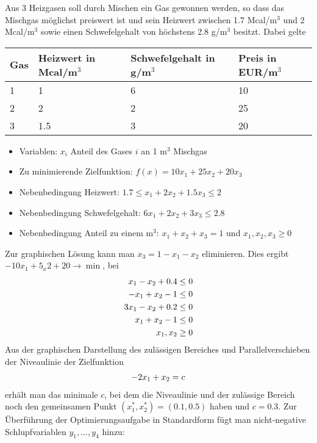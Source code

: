 \setcounter{theorem}{0}
\begin{example}
	Aus 3 Heizgasen soll durch Mischen ein Gas gewonnen werden, so dass das Mischgas möglichst preiswert ist und sein Heizwert zwischen 1.7 Mcal/m$^3$ und 2 Mcal/m$^3$ sowie einen Schwefelgehalt von höchstens 2.8 g/m$^3$ besitzt. Dabei gelte
	\begin{center}
		\begin{tabular}{p{2.5cm}|p{2.5cm}|p{2.5cm}|p{2.5cm}}
			Gas & Heizwert in Mcal/m$^3$ & Schwefelgehalt in g/m$^3$ & Preis in EUR/m$^3$ \\
			\hline
			1 & 1 & 6 & 10 \\
			2 & 2 & 2 & 25 \\
			3 & 1.5 & 3 & 20\\
		\end{tabular}
	\end{center}
	\begin{itemize}
		\item Variablen: $x_i$ Anteil des Gases $i$ an 1 m$^3$ Mischgas
		\item Zu minimierende Zielfunktion: $f(x)=10x_1+25x_2+20x_3$
		\item Nebenbedingung Heizwert: $1.7\le x_1+2x_2+1.5x_3\le 2$
		\item Nebenbedingung Schwefelgehalt: $6x_1+2x_2+3x_3\le 2.8$
		\item Nebenbedingung Anteil zu einem m$^3$: $x_1+x_2+x_3=1$ und $x_1,x_2,x_3\ge 0$
	\end{itemize}
	Zur graphischen Lösung kann man $x_3=1-x_1-x_2$ eliminieren. Dies ergibt $-10x_1+5_x2+20\to\min$, bei
	\begin{align}
		x_1-x_2+0.4 &\le 0 \notag \\
		-x_1+x_2-1 &\le 0 \notag \\
		3x_1-x_2+0.2 &\le 0 \notag \\
		x_1+x_2-1 &\le 0\notag \\
		x_1,x_2 &\ge 0 \notag
	\end{align}
	Aus der graphischen Darstellung des zulässigen Bereiches und Parallelverschieben der Niveaulinie der Zielfunktion
	\begin{align}
		-2x_1+x_2 =c \notag
	\end{align}
	erhält man das minimale $c$, bei dem die Niveaulinie und der zulässige Bereich noch den gemeinsamen Punkt $(x_1^\ast,x_2^\ast)=(0.1,0.5)$ haben und $c=0.3$. Zur Überführung der Optimierungsaufgabe in Standardform fügt man nicht-negative Schlupfvariablen $y_1,...,y_4$ hinzu:
	\begin{align}

\end{align}
\end{example}
